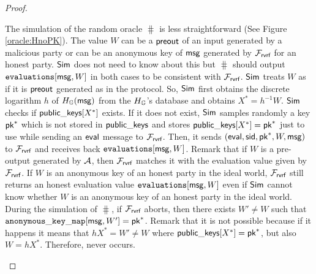 \begin{proof}
\begin{itemize}
		
		The simulation of the random oracle $ \hash $ is less straightforward (See Figure \ref{oracle:HnoPK}).
		The value $ W $ can be a $ {\mathsf{preout}} $ of an input generated by a malicious party or can be an anonymous key of  $ \mathsf{msg} $ generated by $ \mathcal{F}_{\textsf{rvrf}} $ for an honest party. $ \mathsf{Sim} $ does not need to know about this but $ \hash $ should output $ \texttt{evaluations}[\mathsf{msg},W] $ in both cases to be consistent with $ \mathcal{F}_{\textsf{rvrf}} $.	 
		$ \mathsf{Sim} $ treats $ W $ as if it is $ {\mathsf{preout}} $ generated as in the protocol. So, $ \mathsf{Sim} $ first obtains the discrete logarithm $ h $ of $ H_{\mathbb{G}}(\mathsf{msg}) $ from the $ H_{\mathbb{G}} $'s database and obtains $ X^* = h^{-1}W $.    
		$ \mathsf{Sim} $ checks if $ {\mathsf{public\_keys}}[X^*] $ exists. If it does not exist, $ \mathsf{Sim} $ samples randomly a key $ \mathsf{pk}^* $ which is not stored in $ {\mathsf{public\_keys}} $ and stores $ {\mathsf{public\_keys}}[X^*] = \mathsf{pk}^* $ just to use while sending an $ \mathsf{eval} $ message to $ \mathcal{F}_{\textsf{rvrf}} $. Then, it sends  $ (\mathsf{eval}, \textsf{sid},\mathsf{pk}^*,W,\mathsf{msg}) $ to $ \mathcal{F}_{\textsf{rvrf}} $ and receives back $ \texttt{evaluations}[\mathsf{msg},W] $.
		Remark that if $ W $ is a pre-output generated by $ \mathcal{A} $, then $ \mathcal{F}_{\textsf{rvrf}} $ matches it with the evaluation value given by $ \mathcal{F}_{\textsf{rvrf}} $. If $ W $ is an anonymous key of an honest party in the ideal world, $ \mathcal{F}_{\textsf{rvrf}} $ still returns an honest evaluation value $ \texttt{evaluations}[\mathsf{msg},W] $ even if $ \mathsf{Sim} $ cannot know whether $ W $ is an anonymous key of an honest party in the ideal world. 
		During the simulation of $ \hash $, if $ \mathcal{F}_{\textsf{rvrf}} $ aborts, then there exists $ W' \neq W $ such that $ \mathtt{anonymous\_key\_map}[\mathsf{msg},W'] = \mathsf{pk}^* $. Remark that it is not possible because if it happens it means that $ hX^* = W' \neq W  $ where $ {\mathsf{public\_keys}}[X^*] = \mathsf{pk}^* $, but also $ W = hX^* $. 
		Therefore,  never occurs.
		
		


\end{itemize}
\end{proof}
